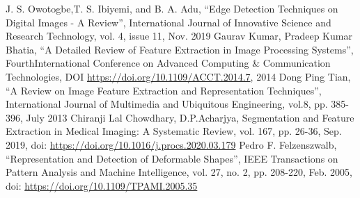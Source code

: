 \documentclass[conference]{IEEEtran}
\begin{document}







\begin{thebibliography}{00}

 J. S. Owotogbe,T. S. Ibiyemi, and B. A. Adu, ``Edge Detection Techniques on Digital Images - A Review'', International Journal of Innovative Science and Research Technology, vol. 4, issue 11, Nov. 2019
 Gaurav Kumar, Pradeep Kumar Bhatia, ``A Detailed Review of Feature Extraction in Image Processing Systems'', FourthInternational Conference on Advanced Computing \& Communication Technologies, DOI \url{https://doi.org/10.1109/ACCT.2014.7}, 2014
 Dong Ping Tian, ``A Review on Image Feature Extraction and Representation Techniques'', International Journal of Multimedia and Ubiquitous Engineering, vol.8, pp. 385-396, July 2013
 Chiranji Lal Chowdhary, D.P.Acharjya, Segmentation and Feature Extraction in Medical Imaging: A Systematic Review, vol. 167, pp. 26-36, Sep. 2019, doi: \url{https://doi.org/10.1016/j.procs.2020.03.179}
 Pedro F. Felzenszwalb, ``Representation and Detection of Deformable Shapes'', IEEE Transactions on Pattern Analysis and Machine Intelligence, vol. 27, no. 2, pp. 208-220, Feb. 2005, doi: \url{https://doi.org/10.1109/TPAMI.2005.35} 

\end{thebibliography}
\end{document}
